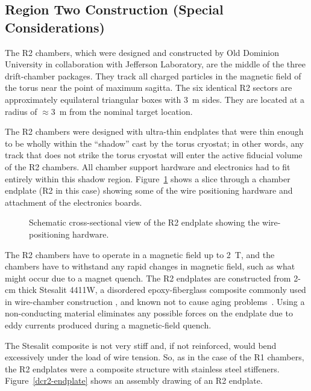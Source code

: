 \subsection{Region Two Construction (Special Considerations)}
\label{region2}

The R2 chambers, which were designed and constructed by Old Dominion University 
in collaboration with Jefferson Laboratory, are the middle of the three  
drift-chamber packages.  They track all charged particles in the magnetic field 
of the torus near the point of maximum sagitta.  The six identical R2 sectors 
are approximately equilateral triangular boxes with 3~m sides. 
They are located at a radius of $\approx$3~m from the nominal target location.  
  
The R2 chambers were designed with ultra-thin endplates that were thin enough
to be wholly within the ``shadow'' cast by the torus cryostat; in other words,
any track that does not strike the torus cryostat will enter the active fiducial 
volume of the R2 chambers. 
All chamber support hardware and electronics had to fit 
entirely within this shadow region.
Figure~\ref{dc-corner} shows a slice through a chamber endplate (R2 in this case)
showing some of the wire positioning hardware and attachment of the electronics 
boards.

\begin{figure}[htpb]   
\vspace{8cm}
\caption{\small{Schematic cross-sectional view of the R2 endplate showing the
wire-positioning hardware.}}
\label{dc-corner}
\end{figure}   

The R2 chambers have to operate 
in a magnetic field up to 2~T, and the chambers have to withstand any rapid 
changes in magnetic field, such as what might occur due to a magnet quench.
The R2 endplates are constructed from 2-cm thick Stesalit 4411W, a disordered 
epoxy-fiberglass composite commonly used in wire-chamber construction
\cite{stesalit}, and known not to cause aging problems~\cite{stesalitaging}.  
Using a non-conducting material eliminates any possible forces on the endplate 
due to eddy currents produced during a magnetic-field quench.  

The Stesalit composite is not very stiff and, if not reinforced, would
bend excessively under the load of wire tension.  So, as in the case of
the R1 chambers, the R2 endplates were a composite structure with
stainless steel stiffeners. Figure~\ref{dcr2-endplate} shows an assembly drawing of an R2 endplate.

